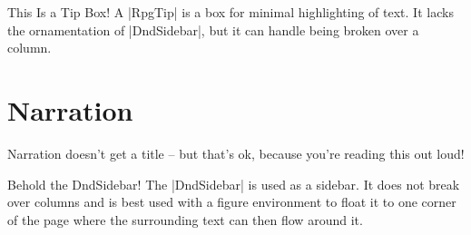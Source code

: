 	\begin{RpgTip}{This Is a Tip Box!}
	A |RpgTip| is a box for minimal highlighting of text. It lacks the ornamentation of |DndSidebar|, but it can handle being broken over a column.
	\end{RpgTip}



	\section{Narration}

	\begin{RpgNarration}
		Narration doesn't get a title -- but that's ok, because you're reading this out loud!
	\end{RpgNarration}

	\begin{RpgSidebar}[]{Behold the DndSidebar!}
  The |DndSidebar| is used as a sidebar. It does not break over columns and is best used with a figure environment to float it to one corner of the page where the surrounding text can then flow around it.
\end{RpgSidebar}
